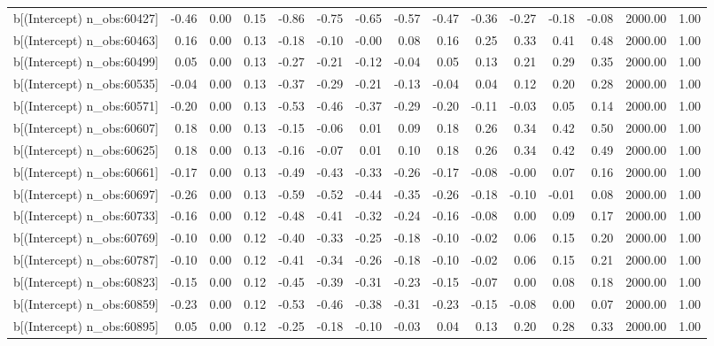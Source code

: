 \begin{table}[ht]
\begin{tabular}{rrrrrrrrrrrrrrr}
  b[(Intercept) n\_obs:60427] & -0.46 & 0.00 & 0.15 & -0.86 & -0.75 & -0.65 & -0.57 & -0.47 & -0.36 & -0.27 & -0.18 & -0.08 & 2000.00 & 1.00 \\ 
  b[(Intercept) n\_obs:60463] & 0.16 & 0.00 & 0.13 & -0.18 & -0.10 & -0.00 & 0.08 & 0.16 & 0.25 & 0.33 & 0.41 & 0.48 & 2000.00 & 1.00 \\ 
  b[(Intercept) n\_obs:60499] & 0.05 & 0.00 & 0.13 & -0.27 & -0.21 & -0.12 & -0.04 & 0.05 & 0.13 & 0.21 & 0.29 & 0.35 & 2000.00 & 1.00 \\ 
  b[(Intercept) n\_obs:60535] & -0.04 & 0.00 & 0.13 & -0.37 & -0.29 & -0.21 & -0.13 & -0.04 & 0.04 & 0.12 & 0.20 & 0.28 & 2000.00 & 1.00 \\ 
  b[(Intercept) n\_obs:60571] & -0.20 & 0.00 & 0.13 & -0.53 & -0.46 & -0.37 & -0.29 & -0.20 & -0.11 & -0.03 & 0.05 & 0.14 & 2000.00 & 1.00 \\ 
  b[(Intercept) n\_obs:60607] & 0.18 & 0.00 & 0.13 & -0.15 & -0.06 & 0.01 & 0.09 & 0.18 & 0.26 & 0.34 & 0.42 & 0.50 & 2000.00 & 1.00 \\ 
  b[(Intercept) n\_obs:60625] & 0.18 & 0.00 & 0.13 & -0.16 & -0.07 & 0.01 & 0.10 & 0.18 & 0.26 & 0.34 & 0.42 & 0.49 & 2000.00 & 1.00 \\ 
  b[(Intercept) n\_obs:60661] & -0.17 & 0.00 & 0.13 & -0.49 & -0.43 & -0.33 & -0.26 & -0.17 & -0.08 & -0.00 & 0.07 & 0.16 & 2000.00 & 1.00 \\ 
  b[(Intercept) n\_obs:60697] & -0.26 & 0.00 & 0.13 & -0.59 & -0.52 & -0.44 & -0.35 & -0.26 & -0.18 & -0.10 & -0.01 & 0.08 & 2000.00 & 1.00 \\ 
  b[(Intercept) n\_obs:60733] & -0.16 & 0.00 & 0.12 & -0.48 & -0.41 & -0.32 & -0.24 & -0.16 & -0.08 & 0.00 & 0.09 & 0.17 & 2000.00 & 1.00 \\ 
  b[(Intercept) n\_obs:60769] & -0.10 & 0.00 & 0.12 & -0.40 & -0.33 & -0.25 & -0.18 & -0.10 & -0.02 & 0.06 & 0.15 & 0.20 & 2000.00 & 1.00 \\ 
  b[(Intercept) n\_obs:60787] & -0.10 & 0.00 & 0.12 & -0.41 & -0.34 & -0.26 & -0.18 & -0.10 & -0.02 & 0.06 & 0.15 & 0.21 & 2000.00 & 1.00 \\ 
  b[(Intercept) n\_obs:60823] & -0.15 & 0.00 & 0.12 & -0.45 & -0.39 & -0.31 & -0.23 & -0.15 & -0.07 & 0.00 & 0.08 & 0.18 & 2000.00 & 1.00 \\ 
  b[(Intercept) n\_obs:60859] & -0.23 & 0.00 & 0.12 & -0.53 & -0.46 & -0.38 & -0.31 & -0.23 & -0.15 & -0.08 & 0.00 & 0.07 & 2000.00 & 1.00 \\ 
  b[(Intercept) n\_obs:60895] & 0.05 & 0.00 & 0.12 & -0.25 & -0.18 & -0.10 & -0.03 & 0.04 & 0.13 & 0.20 & 0.28 & 0.33 & 2000.00 & 1.00 \\ 

\end{tabular}
\end{table}
